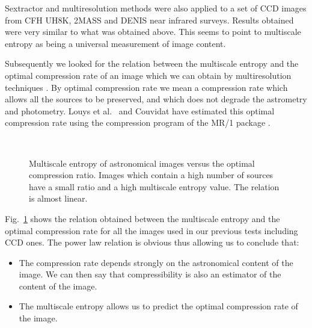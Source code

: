Sextractor and multiresolution methods were also applied to a set of CCD 
images from CFH UH8K, 2MASS and DENIS near infrared surveys.
Results obtained were very similar to what was obtained above.  This seems
to point to multiscale entropy as being a universal measurement of image 
content.

Subsequently we looked for the relation between the multiscale entropy and 
the optimal compression
rate of an image which we can obtain by multiresolution 
techniques \cite{starck:book98}. 
 By optimal compression rate we mean 
a compression rate which allows all the sources to be preserved, and which 
does not
degrade the astrometry and photometry.
Louys et al.\ \cite{starck:louys99}  and Couvidat \cite{compress:couvidat99}
have  estimated   this optimal
compression rate using the compression program of the 
MR/1 package  \cite{starck:mr1_99}.

\begin{figure}[htb]
\centerline{
\hbox{
}}
\caption{Multiscale entropy of astronomical images versus the optimal
compression ratio. Images which contain a high number of sources have
a small ratio and a high multiscale entropy value. The relation 
is almost linear.}
\label{fig_cds_taux}
\end{figure}

Fig.~\ref{fig_cds_taux} shows the relation obtained 
between the multiscale entropy and the optimal compression rate
for all the images used in our previous tests including CCD ones. 
The power law  relation is obvious thus allowing us to conclude that:
\begin{itemize}
\item  The compression rate depends strongly on the astronomical content 
of the image. We can then say that compressibility is 
also an estimator of the content of the image.
\item The multiscale entropy allows us to predict the optimal 
compression rate of the image.
\end{itemize}

